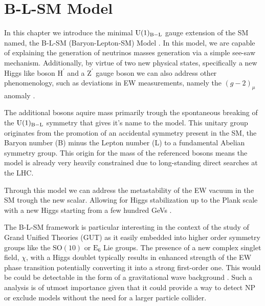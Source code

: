 \newpage 

% 
% 
% 

\chapter{B-L-SM Model} 


%
In this chapter we introduce the minimal $\mathrm{U}(1)_{\mathrm{B-L}}$ gauge extension of the SM named, the B-L-SM (Baryon-Lepton-SM) Model \cite{Mohapatra:1980qe,Basso:2010hk,Basso:2011na}. 
%
In this model, we are capable of explaining the generation of neutrinos masses generation via a simple see-saw mechanism. Additionally, by virtue of two new physical states, specifically a new Higgs like boson $\mathrm{H}^\prime$ and a $\mathrm{Z}^\prime$ gauge boson we can also address other phenomenology, such as deviations in EW measurements, namely the $(g-2)_\mu$ anomaly \cite{Tanabashi:2018oca}. 

The additional bosons aquire mass primarily trough the spontaneous breaking of the $\mathrm{U}(1)_{\mathrm{B-L}}$ symmetry that gives it's name to the model.
%
This unitary group originates from the promotion of an accidental symmetry present in the SM, the Baryon number (B) minus the Lepton number (L) to a fundamental Abelian symmetry group. 
%
This origin for the mass of the referenced bosons means the model is already very heavily constrained due to long-standing direct searches at the LHC. 

Through this model we can address the metastability of the EW vacuum in the SM trough the new scalar. Allowing for Higgs stabilization up to the Plank scale with a new Higgs starting from a few hundred GeVs \cite{Degrassi:2012ry,Alekhin:2012py,Buttazzo:2013uya}. 

The B-L-SM framework is particular interesting in the context of the study of Grand Unified Theories (GUT) as it easily embedded into higher order symmetry groups like the $\mathrm{SO(10)}$ \cite{Chanowitz:1977ye,Fritzsch:1974nn,Georgi:1978fu,Georgi:1979dq,Georgi:1979ga} or $\mathrm{E}_6$ \cite{Achiman:1978vg,Gursey:1975ki,Gursey:1981kf} Lie groups.   
The presence of a new complex singlet field, $\chi$, with a Higgs doublet typically results in enhanced strength of the EW phase transition potentially converting it into a strong first-order one. This would be could be detectable in the form of a gravitational wave background \cite{Barger:2008jx}. 
%
Such a analysis is of utmost importance given that it could provide a way to detect NP or exclude models without the need for a larger particle collider. %

